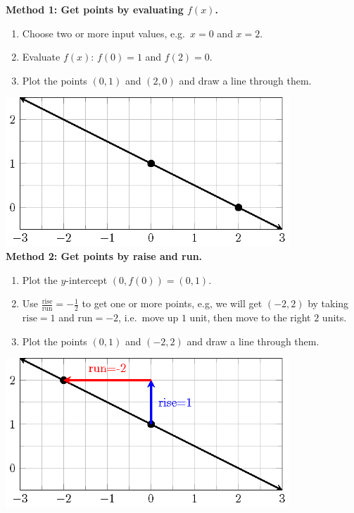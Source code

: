 \documentclass[en,12pt]{elegantbook}
\providecommand{\tightlist}{%
  \setlength{\itemsep}{0pt}\setlength{\parskip}{0pt}}
\providecommand{\tightlist}{%
  \setlength{\itemsep}{0pt}\setlength{\parskip}{0pt}}
\let\BeginKnitrBlock\begin \let\EndKnitrBlock\end
\begin{document}
\BeginKnitrBlock{solution}


\textbf{Method 1: Get points by evaluating \(f(x)\).}

\begin{enumerate}
\def\labelenumi{\arabic{enumi}.}
\tightlist
\item
  Choose two or more input values, e.g.~\(x=0\) and \(x=2\).
\item
  Evaluate \(f(x)\): \(f(0)=1\) and \(f(2)=0\).
\item
  Plot the points \((0, 1)\) and \((2, 0)\) and draw a line through them.
\end{enumerate}

\includegraphics[width=0.8\textwidth,height=\textheight]{figs/tikz-linear-function-example-a.png}\\

\textbf{Method 2: Get points by raise and run.}

\begin{enumerate}
\def\labelenumi{\arabic{enumi}.}
\tightlist
\item
  Plot the \(y\)-intercept \((0, f(0))=(0, 1)\).
\item
  Use \(\frac{\text{rise}}{\text{run}}=-\frac{1}{2}\) to get one or more points, e.g, we will get \((-2, 2)\) by taking \(\text{rise}=1\) and \(\text{run}=-2\), i.e.~move up \(1\) unit, then move to the right \(2\) units.
\item
  Plot the points \((0, 1)\) and \((-2, 2)\) and draw a line through them.
\end{enumerate}

\includegraphics[width=0.8\textwidth,height=\textheight]{figs/tikz-linear-function-example-b.png}\\
\EndKnitrBlock{solution}
\end{document}
